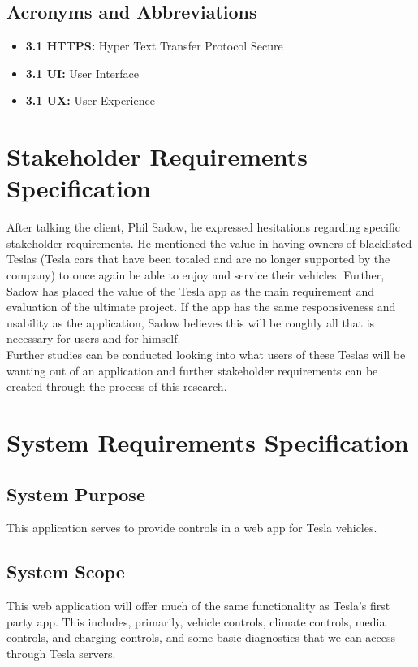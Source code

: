 \documentclass[onecolumn, draftclsnofoot,10pt, compsoc]{IEEEtran}
\begin{document}
\subsection{Acronyms and Abbreviations}
\begin{itemize}
    \item \textbf{3.1 HTTPS:} Hyper Text Transfer Protocol Secure
    \item \textbf{3.1 UI:} User Interface
    \item \textbf{3.1 UX:} User Experience
\end{itemize}
\section{Stakeholder Requirements Specification}
After talking the client, Phil Sadow, he expressed hesitations regarding specific stakeholder requirements. He mentioned the value in having owners of blacklisted Teslas (Tesla cars that have been totaled and are no longer supported by the company) to once again be able to enjoy and service their vehicles. Further, Sadow has placed the value of the Tesla app as the main requirement and evaluation of the ultimate project. If the app has the same responsiveness and usability as the application, Sadow believes this will be roughly all that is necessary for users and for himself.\\
Further studies can be conducted looking into what users of these Teslas will be wanting out of an application and further stakeholder requirements can be created through the process of this research. 

\section{System Requirements Specification}
\subsection{System Purpose}
This application serves to provide controls in a web app for Tesla vehicles.
\subsection{System Scope}
This web application will offer much of the same functionality as Tesla's first party app. This includes, primarily, vehicle controls, climate controls, media controls, and charging controls, and some basic diagnostics that we can access through Tesla servers.
\end{document}
